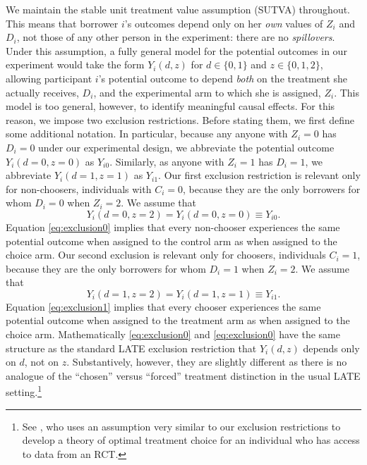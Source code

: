 \documentclass[oneside,11pt]{article}
\begin{document}
We maintain the stable unit treatment value assumption (SUTVA) throughout. 
This means that borrower $i$'s outcomes depend only on her \emph{own} values of $Z_i$ and $D_i$, not those of any other person in the experiment: there are no \emph{spillovers}. 
Under this assumption, a fully general model for the potential outcomes in our experiment would take the form $Y_i(d, z)$ for $d\in \{0,1\}$ and $z \in \{0, 1, 2\}$, allowing participant $i$'s potential outcome to depend \emph{both} on the treatment she actually receives, $D_i$, and the experimental arm to which she is assigned, $Z_i$. 
This model is too general, however, to identify meaningful causal effects. 
For this reason, we impose two exclusion restrictions.
Before stating them, we first define some additional notation.
In particular, because any anyone with $Z_i = 0$ has $D_i = 0$ under our experimental design, we abbreviate the potential outcome $Y_i(d=0,z=0)$ as $Y_{i0}$. 
Similarly, as anyone with $Z_i = 1$ has $D_i = 1$, we abbreviate $Y_i(d=1,z=1)$ as $Y_{i1}$. 
Our first exclusion restriction is relevant only for non-choosers, individuals with $C_i = 0$, because they are the only borrowers for whom $D_i = 0$ when $Z_i = 2$.
We assume that
\begin{equation}
Y_i(d=0,z=2) = Y_i(d=0,z=0) \equiv Y_{i0}.
\label{eq:exclusion0}
\end{equation}
Equation \ref{eq:exclusion0} implies that every non-chooser experiences the same potential outcome when assigned to the control arm as when assigned to the choice arm. 
Our second exclusion is relevant only for choosers, individuals $C_i =1$, because they are the only borrowers for whom $D_i = 1$ when $Z_i = 2$.
We assume that 
\begin{equation}
Y_i(d=1,z=2) = Y_i(d=1,z=1)\equiv Y_{i1}.
\label{eq:exclusion1}
\end{equation}
Equation \ref{eq:exclusion1} implies that every chooser experiences the same potential outcome when assigned to the treatment arm as when assigned to the choice arm. 
Mathematically \eqref{eq:exclusion0} and \eqref{eq:exclusion0} have the same structure as the standard LATE exclusion restriction that $Y_i(d,z)$ depends only on $d$, not on $z$. 
Substantively, however, they are slightly different as there is no analogue of the ``chosen'' versus ``forced'' treatment distinction in the usual LATE setting.\footnote{See \cite{chamberlain2011bayesian}, who uses an assumption very similar to our exclusion restrictions to develop a theory of optimal treatment choice for an individual who has access to data from an RCT.} 
\end{document}
